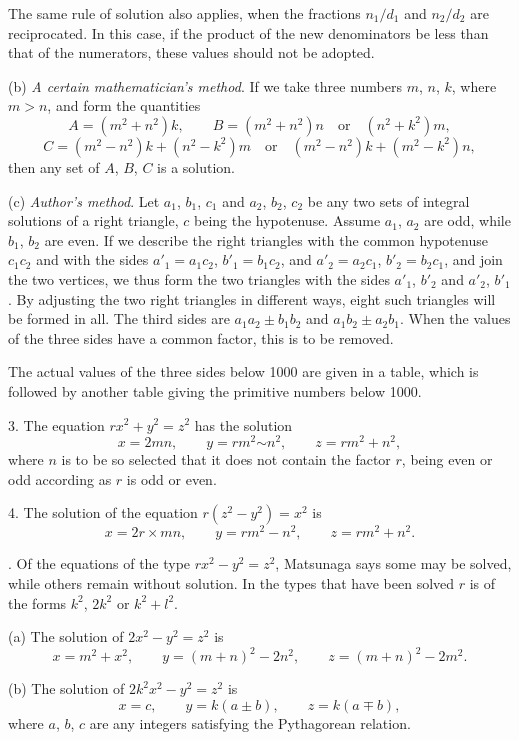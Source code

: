 \documentclass[11pt]{article}
\newcommand{\scanpage}[2]{\clearpage\setcounter{footnote}{0}\noindent{\footnotesize\color{gray}PDF page #1 · #2}\par\medskip}
\newcommand{\scanfooter}{}
\begin{document}
The same rule of solution also applies, when the fractions $n_1/d_1$ and $n_2/d_2$ are reciprocated. In this case, if the product of the new denominators be less than that of the numerators, these values should not be adopted.

(b) \emph{A certain mathematician's method}. If we take three numbers $m$, $n$, $k$, where $m>n$, and form the quantities
\[
A=(m^2+n^2)k,\qquad B=(m^2+n^2)n\quad\text{or}\quad(n^2+k^2)m,
\]
\[
C=(m^2-n^2)k+(n^2-k^2)m\quad\text{or}\quad(m^2-n^2)k+(m^2-k^2)n,
\]
then any set of $A$, $B$, $C$ is a solution.

(c) \emph{Author's method}. Let $a_1$, $b_1$, $c_1$ and $a_2$, $b_2$, $c_2$ be any two sets of integral solutions of a right triangle, $c$ being the hypotenuse. Assume $a_1$, $a_2$ are odd, while $b_1$, $b_2$ are even. If we describe the right triangles with the common hypotenuse $c_1c_2$ and with the sides $a'_1=a_1c_2$, $b'_1=b_1c_2$, and $a'_2=a_2c_1$, $b'_2=b_2c_1$, and join the two vertices, we thus form the two triangles with the sides $a'_1$, $b'_2$ and $a'_2$, $b'_1$. By adjusting the two right triangles in different ways, eight such triangles will be formed in all. The third sides are $a_1a_2\pm b_1b_2$ and $a_1b_2\pm a_2b_1$. When the values of the three sides have a common factor, this is to be removed.

The actual values of the three sides below 1000 are given in a table, which is followed by another table giving the primitive numbers below 1000.

3. The equation $rx^2+y^2=z^2$ has the solution
\[
x=2mn,\qquad y=rm^2\mathord{\sim}n^2,\qquad z=rm^2+n^2,
\]
where $n$ is to be so selected that it does not contain the factor $r$, being even or odd according as $r$ is odd or even.

4. The solution of the equation $r(z^2-y^2)=x^2$ is
\[
x=2r\times mn,\qquad y=rm^2-n^2,\qquad z=rm^2+n^2.
\]
\scanfooter

\scanpage{0246}{Chapter 32, printed page 232}
5. Of the equations of the type $rx^2-y^2=z^2$, Matsunaga says some may be solved, while others remain without solution. In the types that have been solved $r$ is of the forms $k^2$, $2k^2$ or $k^2+l^2$.

(a) The solution of $2x^2-y^2=z^2$ is
\[
x=m^2+x^2,\qquad y=(m+n)^2-2n^2,\qquad z=(m+n)^2-2m^2.
\]

(b) The solution of $2k^2x^2-y^2=z^2$ is
\[
x=c,\qquad y=k(a\pm b),\qquad z=k(a\mp b),
\]
where $a$, $b$, $c$ are any integers satisfying the Pythagorean relation.
\end{document}
